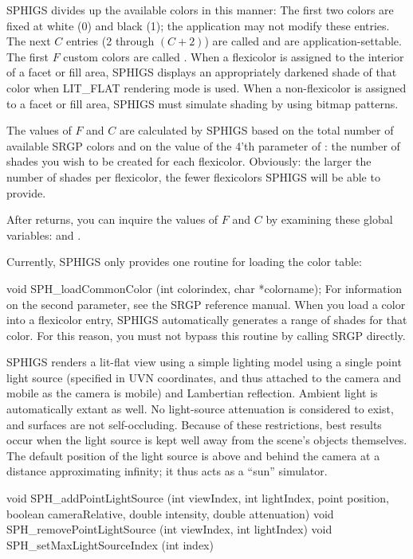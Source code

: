 \newpar
SPHIGS divides up the available colors in this manner: The first two colors are
fixed at white (0) and black (1); the application may not modify these entries.
The next $C$ entries (2 through $(C+2)$) are called
 and are application-settable.
The first $F$ custom colors are called
.  When a flexicolor is assigned to the interior of a facet
or fill area, SPHIGS displays an appropriately darkened shade of that color
when LIT\_FLAT rendering mode is used.  When a non-flexicolor is assigned to a
facet or fill area, SPHIGS must simulate shading by using bitmap patterns.

\newpar
The values of $F$ and $C$ are calculated by SPHIGS based on the total number of
available SRGP colors and on the value of the 4'th parameter of
: the number of shades you wish to be created for 
each flexicolor.  Obviously: the larger the number of shades per flexicolor,
the fewer flexicolors SPHIGS will be able to provide.

\newpar
After  returns, you can inquire the values of $F$ and $C$ by
examining these global variables:  and 
.

\newpar
Currently, SPHIGS only provides one routine for loading the color table:

\nextsynopsis
void SPH_loadCommonColor (int colorindex, char *colorname);
\endsynopsis
For information on the second parameter, see the SRGP reference manual.  When
you load a color into a flexicolor entry, SPHIGS automatically generates a
range of shades for that color.  For this reason, you must not bypass this
routine by calling SRGP directly.

\newpar
SPHIGS renders a lit-flat view using a simple lighting model using a single
point light source (specified in UVN coordinates, and thus attached to the
camera and mobile as the camera is mobile) and Lambertian reflection.  Ambient
light is automatically extant as well.  No light-source attenuation is
considered to exist, and surfaces are not self-occluding.  Because of these
restrictions, best results occur when the light source is kept well away from
the scene's objects themselves.  The default position of the light source is
above and behind the camera at a distance approximating infinity; it thus acts
as a ``sun'' simulator.

\begincode
void SPH_addPointLightSource (int viewIndex, int lightIndex,
		    point position, boolean cameraRelative, 
		    double intensity, double attenuation)
void SPH_removePointLightSource (int viewIndex, int lightIndex)
void SPH_setMaxLightSourceIndex (int index)
\endcode

